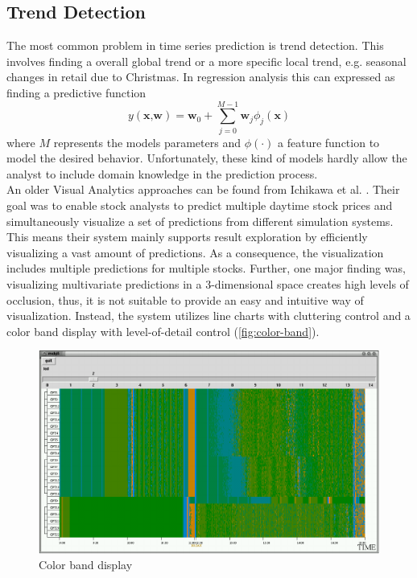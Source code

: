 \documentclass[electronic]{vgtc}             %
\begin{document}
\subsection{Trend Detection\label{subsec:trend}}
The most common problem in time series prediction is trend detection.
This involves finding a overall global trend or a more specific local trend, e.g. seasonal changes in retail due to Christmas.
In regression analysis this can expressed as finding a predictive function 
\[
y(\textbf{x,w}) = \textbf{w}_0 + \sum_{j=0}^{M-1} \textbf{w}_j \phi_j(\textbf{x})
\]
where $M$ represents the models parameters and $\phi(\cdot)$ a feature function to model the desired behavior. 
Unfortunately, these kind of models hardly allow the analyst to include domain knowledge in the prediction process.\\

An older Visual Analytics approaches can be found from Ichikawa et al. \cite{ichikawa:2002}.
Their goal was to enable stock analysts to predict multiple daytime stock prices and simultaneously visualize a set of predictions from different simulation systems. 
This means their system mainly supports result exploration by efficiently visualizing a vast amount of predictions.
As a consequence, the visualization includes multiple predictions for multiple stocks. 
Further, one major finding was, visualizing multivariate predictions in a 3-dimensional space creates high levels of occlusion, thus, it is not suitable to provide an easy and intuitive way of visualization.
Instead, the system utilizes line charts with cluttering control and a color band display with level-of-detail control (\autoref{fig:color-band}). 

\begin{figure}[htb]
	\centering
	\includegraphics[width=\columnwidth]{color-band}
	\caption{Color band display \cite{ichikawa:2002}}
	\label{fig:color-band}
\end{figure}
\end{document}
